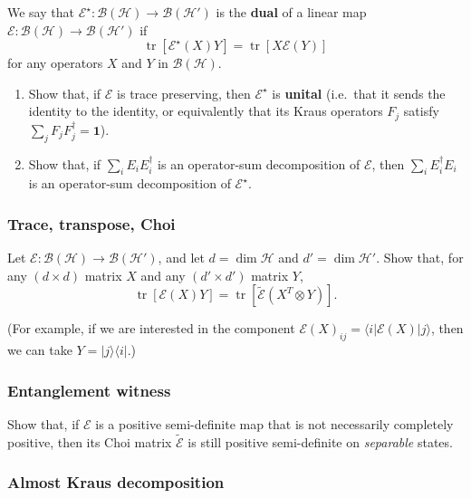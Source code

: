 \documentclass[fleqn,a4paper]{article}
\providecommand{\tightlist}{\setlength{\itemsep}{0pt}\setlength{\parskip}{0pt}}
\theoremstyle{definition}
\theoremstyle{definition}
\theoremstyle{definition}
\theoremstyle{definition}
\theoremstyle{remark}
\begin{document}
We say that \(\mathcal{E}^\star\colon\mathcal{B}(\mathcal{H})\to\mathcal{B}(\mathcal{H}')\) is the \textbf{dual} of a linear map \(\mathcal{E}\colon\mathcal{B}(\mathcal{H})\to\mathcal{B}(\mathcal{H}')\) if
\[
  \operatorname{tr}[\mathcal{E}^\star (X)Y] = \operatorname{tr}[X\mathcal{E}(Y)]
\]
for any operators \(X\) and \(Y\) in \(\mathcal{B}(\mathcal{H})\).

\begin{enumerate}
\def\labelenumi{\arabic{enumi}.}
\tightlist
\item
  Show that, if \(\mathcal{E}\) is trace preserving, then \(\mathcal{E}^\star\) is \textbf{unital} (i.e.~that it sends the identity to the identity, or equivalently that its Kraus operators \(F_j\) satisfy \(\sum_j F_jF_j^\dagger=\mathbf{1}\)).
\item
  Show that, if \(\sum_i E_i E_i^\dagger\) is an operator-sum decomposition of \(\mathcal{E}\), then \(\sum_i E^\dagger_i E_i\) is an operator-sum decomposition of \(\mathcal{E}^\star\).
\end{enumerate}

\hypertarget{trace-transpose-choi}{%
\subsubsection{Trace, transpose, Choi}\label{trace-transpose-choi}}

Let \(\mathcal{E}\colon\mathcal{B}(\mathcal{H})\to\mathcal{B}(\mathcal{H}')\), and let \(d=\dim\mathcal{H}\) and \(d'=\dim\mathcal{H}'\).
Show that, for any \((d\times d)\) matrix \(X\) and any \((d'\times d')\) matrix \(Y\),
\[
  \operatorname{tr}[\mathcal{E}(X)Y]
  = \operatorname{tr}[\widetilde{\mathcal{E}} (X^T\otimes Y)].
\]

(For example, if we are interested in the component \(\mathcal{E}(X)_{ij}=\langle i|\mathcal{E}(X)|j\rangle\), then we can take \(Y=|j\rangle\langle i|\).)

\hypertarget{entanglement-witness}{%
\subsubsection{Entanglement witness}\label{entanglement-witness}}

Show that, if \(\mathcal{E}\) is a positive semi-definite map that is not necessarily completely positive, then its Choi matrix \(\widetilde{\mathcal{E}}\) is still positive semi-definite on \emph{separable} states.

\hypertarget{almost-kraus-decomposition}{%
\subsubsection{Almost Kraus decomposition}\label{almost-kraus-decomposition}}
\end{document}
